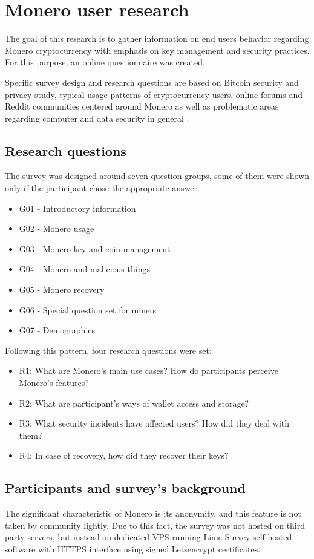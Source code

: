 \documentclass[
  printed, %
  table,   %
  nolof,     %
  nolot,     %
           oneside, color
]{fithesis3}
\begin{document}
\chapter{Monero user research}
\label{cha:monerousersurvey}
The goal of this research is to gather information on end users behavior regarding Monero cryptocurrency with emphasis on key management and security practices. For this purpose, an online questionnaire was created. 

Specific survey design and research questions are based on Bitcoin security and privacy study, typical usage patterns of cryptocurrency users, online forums and Reddit communities centered around Monero as well as problematic areas regarding computer and data security in general \cite{krombholz2016other}.
\section{Research questions}
The survey was designed around seven question groups, some of them were shown only if the participant chose the appropriate answer.
\begin{itemize}\itemsep0em
\item G01 - Introductory information
\item G02 - Monero usage
\item G03 - Monero key and coin management
\item G04 - Monero and malicious things
\item G05 - Monero recovery
\item G06 - Special question set for miners
\item G07 - Demographics
\end{itemize}
Following this pattern, four research questions were set:
\begin{itemize}\itemsep0em
\item R1: What are Monero's main use cases? How do participants perceive Monero's features? 
\item R2: What are participant's ways of wallet access and storage?
\item R3: What security incidents have affected users? How did they deal with them?
\item R4: In case of recovery, how did they recover their keys?
\end{itemize}
\section{Participants and survey's background}
The significant characteristic of Monero is its anonymity, and this feature is not taken by community lightly. Due to this fact, the survey was not hosted on third party servers, but instead on dedicated VPS running Lime Survey self-hosted software with HTTPS interface using signed Letsencrypt certificates.
\end{document}

